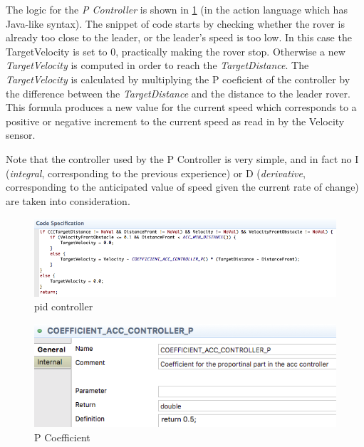 The logic for the \emph{P Controller} is shown in \fig\ref{fig:pid_controller}
(in the \af action language which has Java-like syntax). The snippet of
code starts by checking whether the rover is already too close to the
leader, or the leader's speed is too low. In this case the
\textsf{TargetVelocity} is set to \textsf{0}, practically making the rover stop.
Otherwise a new \emph{TargetVelocity} is computed in order to reach the
\emph{TargetDistance}. The \emph{TargetVelocity} is calculated by multiplying
the \textsf{P} coeficient of the \pid controller by the difference between the
\emph{TargetDistance} and the distance to the leader rover. This formula
produces a new value for the current speed which corresponds to a positive or
negative increment to the current speed as read in by the \textsf{Velocity}
sensor.

Note that the \pid controller used by the \textsf{P Controller} is very simple,
and in fact no \textsf{I} (\emph{integral}, corresponding to the previous
experience) or \textsf{D} (\emph{derivative}, corresponding to the anticipated
value of speed given the current rate of change) are taken into consideration.

\begin{figure}[!h]
\centering
\includegraphics[width=1\textwidth]{images/code_spec_P_controller.png}
\caption{pid controller \af}
\label{fig:pid_controller}
\end{figure}

\begin{figure}[!h]
\centering
\includegraphics[width=.7\textwidth]{images/P_coefficient_controller.png}
\caption{P Coefficient}
\label{fig:p_coefficient}
\end{figure}